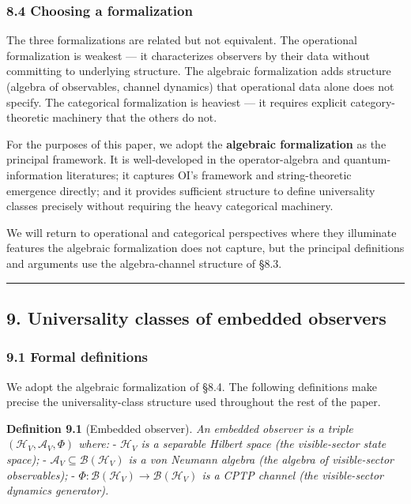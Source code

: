\documentclass[
]{article}
\begin{document}
\hypertarget{choosing-a-formalization}{%
\subsubsection{8.4 Choosing a
formalization}\label{choosing-a-formalization}}

The three formalizations are related but not equivalent. The operational
formalization is weakest --- it characterizes observers by their data
without committing to underlying structure. The algebraic formalization
adds structure (algebra of observables, channel dynamics) that
operational data alone does not specify. The categorical formalization
is heaviest --- it requires explicit category-theoretic machinery that
the others do not.

For the purposes of this paper, we adopt the \textbf{algebraic
formalization} as the principal framework. It is well-developed in the
operator-algebra and quantum-information literatures; it captures OI's
framework and string-theoretic emergence directly; and it provides
sufficient structure to define universality classes precisely without
requiring the heavy categorical machinery.

We will return to operational and categorical perspectives where they
illuminate features the algebraic formalization does not capture, but
the principal definitions and arguments use the algebra-channel
structure of §8.3.

\begin{center}\rule{0.5\linewidth}{0.5pt}\end{center}

\hypertarget{universality-classes-of-embedded-observers}{%
\subsection{9. Universality classes of embedded
observers}\label{universality-classes-of-embedded-observers}}

\hypertarget{formal-definitions}{%
\subsubsection{9.1 Formal definitions}\label{formal-definitions}}

We adopt the algebraic formalization of §8.4. The following definitions
make precise the universality-class structure used throughout the rest
of the paper.

\textbf{Definition 9.1} (Embedded observer). \emph{An embedded observer
is a triple \((\mathcal{H}_V, \mathcal{A}_V, \Phi)\) where:} -
\emph{\(\mathcal{H}_V\) is a separable Hilbert space (the visible-sector
state space);} -
\emph{\(\mathcal{A}_V \subseteq \mathcal{B}(\mathcal{H}_V)\) is a von
Neumann algebra (the algebra of visible-sector observables);} -
\emph{\(\Phi: \mathcal{B}(\mathcal{H}_V) \to \mathcal{B}(\mathcal{H}_V)\)
is a CPTP channel (the visible-sector dynamics generator).}
\end{document}
